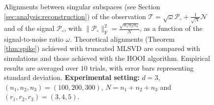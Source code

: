 \documentclass{article}
\begin{document}
\begin{figure}[h]
    
    \caption{Alignments between singular subspaces (see Section \ref{sec:analysis:reconstruction}) of the observation ${\bm{\mathscr{T}}} = \sqrt{\omega}{\bm{\mathscr{P}}}_\circ + \frac{1}{\sqrt{N}}{\bm{\mathscr{N}}}$ and of the signal ${\bm{\mathscr{P}}}_\circ$, with $\lVert{\bm{\mathscr{P}}}_\circ \rVert_{\mathrm{F}}^2 = \frac{\sqrt{n_1 n_2 n_3}}{N}$, as a function of the signal-to-noise ratio $\omega$. Theoretical alignments (Theorem \ref{thm:spike}) achieved with truncated MLSVD are compared with simulations and those achieved with the HOOI algorithm. Empirical results are averaged over $10$ trials, with error bars representing standard deviation. \textbf{Experimental setting:} $d = 3$, $(n_1, n_2, n_3) = (100, 200, 300)$, $N = n_1 + n_2 + n_3$ and $(r_1, r_2, r_3) = (3, 4, 5)$.}
    \label{fig:subspace_alignment}
\end{figure}
\end{document}
